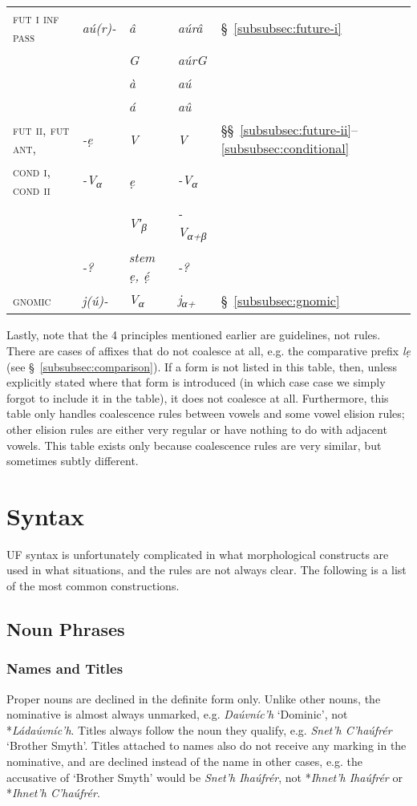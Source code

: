 \documentclass[a4paper, 12pt, twoside, final]{article}
\let \nf \normalfont
\let \w \textit
\let \Sub \textsubscript
\begin{document}
{\begin{longtable}{@{}>{\scshape}l|>{\it}p{5em}|>{\it}l|>{\it}l|l}
fut i inf pass    & aú(r)-  & â & aúrâ & §~\ref{subsubsec:future-i} \\
                  &         &\nf G & aúr\kern1pt\nf G \\
                  &         & à & aú \\
                  &         & á & aû \\\hline
fut ii, fut ant,  & -ẹ      &\nf V &\nf V &§§~\ref{subsubsec:future-ii}–\ref{subsubsec:conditional}\\
cond i, cond ii   &{\nf -V}\Sub α\nf & ẹ & {\nf -V}\Sub α\nf \\
                  &         & {\nf V′}\Sub{β} & {\nf -V}\Sub{α+β} \\
                  &\nf -?   &{\nf stem} ẹ, ẹ́ &\nf -? \\
gnomic            & j(ú)-   & {\nf V}\Sub α& j\kern1pt{\nf V}\Sub{α+} &§~\ref{subsubsec:gnomic} \\\hline
\end{longtable}\par}
\medskip

\noindent Lastly, note that the 4 principles mentioned earlier are guidelines, not rules. There are cases of affixes that do not coalesce
at all, e.g. the comparative prefix \w{lẹ} (see §~\ref{subsubsec:comparison}). If a form is not listed in this table, then,
unless explicitly stated where that form is introduced (in which case case we simply forgot to include it in the table),
it does not coalesce at all. Furthermore, this table only handles coalescence rules between vowels and some vowel elision rules; other
elision rules are either very regular or have nothing to do with adjacent vowels. This table exists only because coalescence rules are
very similar, but sometimes subtly different.

\section{Syntax}\label{sec:syntax}
UF syntax is unfortunately complicated in what morphological constructs are used in what situations, and
the rules are not always clear. The following is a list of the most common constructions.

\subsection{Noun Phrases}
\subsubsection{Names and Titles}\label{subsubsec:names-and-titles}
Proper nouns are declined in the definite form only. Unlike other nouns, the nominative is almost always
unmarked, e.g. \w{Daúvníc’h} ‘Dominic’, not *\w{Ládaúvníc’h}. Titles always follow the noun they qualify,
e.g. \w{Snet’h C’haúfrér} ‘Brother Smyth’. Titles attached to names also do not receive any marking in the
nominative, and are declined instead of the name in other cases, e.g. the accusative of ‘Brother Smyth’
would be \w{Snet’h Ihaúfrér}, not *\w{Ihnet’h Ihaúfrér} or *\w{Ihnet’h C’haúfrér}.
\end{document}

